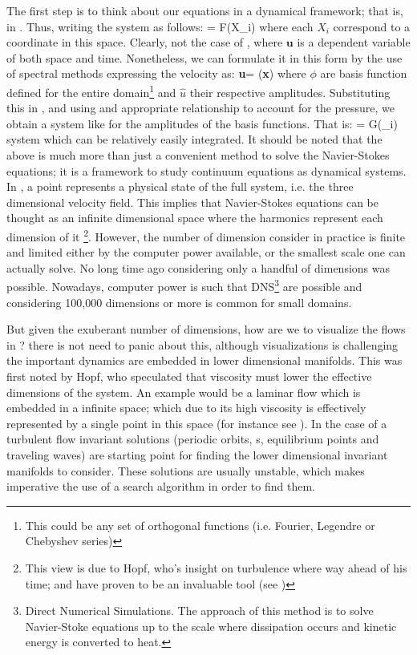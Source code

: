 The first step is to think about our equations in a dynamical framework;
that is, in \statesp. Thus, writing the system as follows:
\beq
{} = F(X_i)
where each $X_i$ correspond to a coordinate in this space. Clearly, not
the case of , where $\textbf{u}$ is a dependent variable of
both space and time. Nonetheless, we can formulate it in this form by the
use of spectral methods expressing the velocity as:
\beq
\textbf{u}=\sum {} \phi (\textbf{x})
where $\phi$ are basis function defined for the entire
domain\footnote{This could be any set of orthogonal functions (i.e.
Fourier, Legendre or Chebyshev series)} and $\widehat{u}$ their
respective amplitudes. Substituting this in , and using and
appropriate relationship to account for the pressure, we obtain a system
like  for the amplitudes of the basis functions. That is:
\beq
{} = G(_i)
system which can be relatively easily integrated.
It should be noted that the above is much more than just a convenient
method to solve the Navier-Stokes equations; it is a framework to study
continuum equations as dynamical systems. In \statesp, a point
represents a physical state of the full system, i.e. the three
dimensional velocity field. This implies that Navier-Stokes equations can
be thought as an infinite dimensional space where the harmonics represent
each dimension of it \footnote{This view is due to Hopf, who's insight on
turbulence where way ahead of his time; and have proven to be an
invaluable tool (see )}. However, the number of dimension
consider in practice is finite and limited either by the computer power
available, or the smallest scale one can actually solve. No long time ago
considering only a handful of dimensions was possible.
Nowadays, computer power is such that DNS\footnote{Direct Numerical
Simulations. The approach of this method is to solve Navier-Stoke
equations up to the scale where dissipation occurs and kinetic energy is
converted to heat.} are possible and considering 100,000 dimensions or
more is common for small domains.

But given the exuberant number of dimensions, how are we to visualize the
flows in \statesp? there is not need to panic about this, although
visualizations is challenging the important dynamics are embedded in
lower dimensional manifolds. This was first noted by Hopf, who speculated
that viscosity must lower the effective dimensions of the system. An
example would be a laminar flow which is embedded in a infinite space;
which due to its high viscosity is effectively represented by a single
point in this space (for instance see ). In the case of a
turbulent flow invariant solutions (periodic orbits, \rpo s, equilibrium
points and traveling waves) are starting point for finding the lower
dimensional invariant manifolds to consider. These solutions are usually
unstable, which makes imperative the use of a search algorithm in order
to find them.

